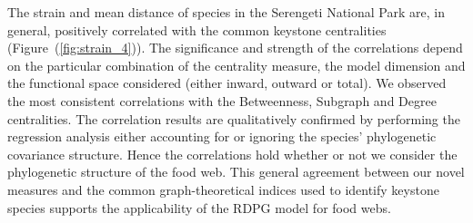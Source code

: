\documentclass[]{rsos}%
\begin{document}
The strain and mean distance of species in the Serengeti National Park are, in
general, positively correlated with the common keystone centralities (Figure~(\ref{fig:strain_4})).
The significance and strength of the correlations depend on the particular
combination of the centrality measure, the  model dimension and the functional space
considered (either inward, outward or total). We observed the most consistent
correlations with the Betweenness, Subgraph and Degree centralities.
The correlation results are qualitatively confirmed by performing the regression analysis
either accounting for or ignoring the species' phylogenetic covariance structure. Hence
the correlations hold whether or not we consider the phylogenetic structure
of the food web. This general agreement between our novel measures and the common graph-theoretical
indices used to identify keystone species supports the applicability of the RDPG model for food
webs.
\end{document}
